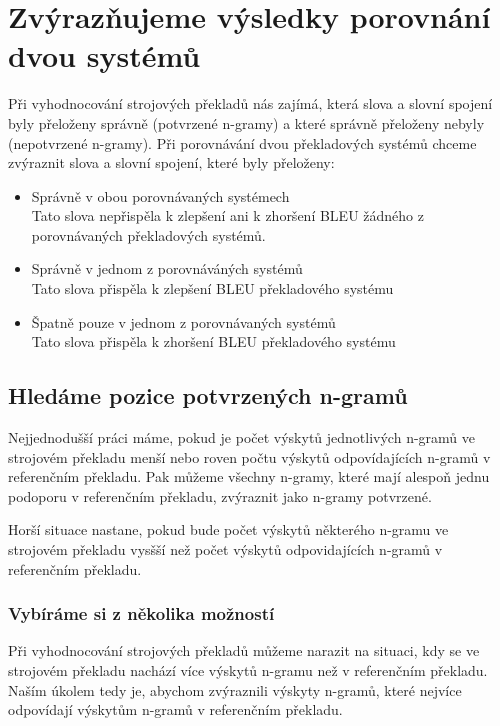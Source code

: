 \newtheorem*{define}{Definice}	%
\newtheorem*{example}{Příklad}	%

\chapter{Zvýrazňujeme výsledky porovnání dvou systémů}
Při vyhodnocování strojových překladů nás zajímá,
  která slova a slovní spojení byly přeloženy správně (potvrzené n-gramy)
  a které správně přeloženy nebyly (nepotvrzené n-gramy).
Při porovnávání dvou překladových systémů chceme zvýraznit slova a slovní spojení,
  které byly přeloženy:

\begin{itemize}
  \item Správně v obou porovnávaných systémech \\
    Tato slova nepřispěla k zlepšení ani k zhoršení BLEU žádného
    z porovnávaných překladových systémů.
  \item Správně v jednom z porovnáváných systémů \\
    Tato slova přispěla k zlepšení BLEU překladového systému
  \item Špatně pouze v jednom z porovnávaných systémů \\
    Tato slova přispěla k zhoršení BLEU překladového systému
\end{itemize}

\section{Hledáme pozice potvrzených n-gramů}


Nejjednodušší práci máme,
  pokud je počet výskytů jednotlivých n-gramů ve strojovém překladu
  menší nebo roven počtu výskytů odpovídajících n-gramů v referenčním překladu.
Pak můžeme všechny n-gramy,
  které mají alespoň jednu podoporu v referenčním překladu,
  zvýraznit jako n-gramy potvrzené.

Horší situace nastane,
  pokud bude počet výskytů některého n-gramu ve strojovém překladu
  vysšší než počet výskytů odpovidajících n-gramů v referenčním překladu.

\subsection{Vybíráme si z několika možností}
Při vyhodnocování strojových překladů můžeme narazit na situaci,
  kdy se ve strojovém překladu nachází více výskytů n-gramu než v referenčním překladu.
Naším úkolem tedy je, abychom zvýraznili výskyty n-gramů,
  které nejvíce odpovídají výskytům n-gramů v referenčním překladu.

